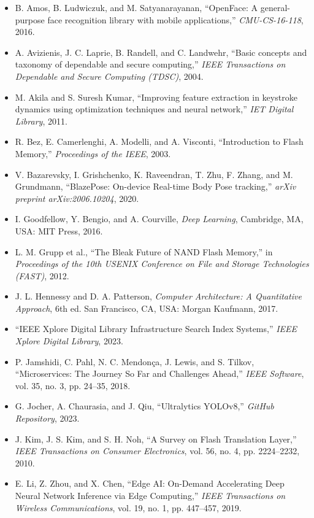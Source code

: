 \documentclass[12pt,a4paper,oneside]{report}
\begin{document}
\begin{itemize}
    \item B. Amos, B. Ludwiczuk, and M. Satyanarayanan, ``OpenFace: A general-purpose face recognition library with mobile applications,'' \textit{CMU-CS-16-118}, 2016.
    \item A. Avizienis, J. C. Laprie, B. Randell, and C. Landwehr, ``Basic concepts and taxonomy of dependable and secure computing,'' \textit{IEEE Transactions on Dependable and Secure Computing (TDSC)}, 2004.
    \item M. Akila and S. Suresh Kumar, ``Improving feature extraction in keystroke dynamics using optimization techniques and neural network,'' \textit{IET Digital Library}, 2011.
    \item R. Bez, E. Camerlenghi, A. Modelli, and A. Visconti, ``Introduction to Flash Memory,'' \textit{Proceedings of the IEEE}, 2003.
    \item V. Bazarevsky, I. Grishchenko, K. Raveendran, T. Zhu, F. Zhang, and M. Grundmann, ``BlazePose: On-device Real-time Body Pose tracking,'' \textit{arXiv preprint arXiv:2006.10204}, 2020.
    \item I. Goodfellow, Y. Bengio, and A. Courville, \textit{Deep Learning}, Cambridge, MA, USA: MIT Press, 2016.
    \item L. M. Grupp et al., ``The Bleak Future of NAND Flash Memory,'' in \textit{Proceedings of the 10th USENIX Conference on File and Storage Technologies (FAST)}, 2012.
    \item J. L. Hennessy and D. A. Patterson, \textit{Computer Architecture: A Quantitative Approach}, 6th ed. San Francisco, CA, USA: Morgan Kaufmann, 2017.
    \item ``IEEE Xplore Digital Library Infrastructure Search Index Systems,'' \textit{IEEE Xplore Digital Library}, 2023.
    \item P. Jamshidi, C. Pahl, N. C. Mendon\c{c}a, J. Lewis, and S. Tilkov, ``Microservices: The Journey So Far and Challenges Ahead,'' \textit{IEEE Software}, vol. 35, no. 3, pp. 24--35, 2018.
    \item G. Jocher, A. Chaurasia, and J. Qiu, ``Ultralytics YOLOv8,'' \textit{GitHub Repository}, 2023.
    \item J. Kim, J. S. Kim, and S. H. Noh, ``A Survey on Flash Translation Layer,'' \textit{IEEE Transactions on Consumer Electronics}, vol. 56, no. 4, pp. 2224--2232, 2010.
    \item E. Li, Z. Zhou, and X. Chen, ``Edge AI: On-Demand Accelerating Deep Neural Network Inference via Edge Computing,'' \textit{IEEE Transactions on Wireless Communications}, vol. 19, no. 1, pp. 447--457, 2019.

\end{itemize}
\end{document}
